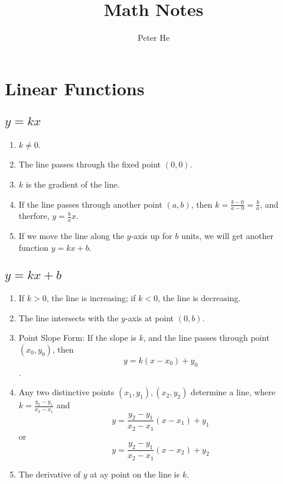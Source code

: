 \documentclass[11pt, oneside]{article}   	%
\title{Math Notes}
\author{Peter He}
\begin{document}
\maketitle




\section{Linear Functions}
\subsection{$y=kx$}
\begin{enumerate}

\item $k\ne0$.
\item The line passes through the fixed point $(0,0)$.
\item $k$ is the gradient of the line.
\item If the line passes through another point $(a,b)$, then $k=\frac{b-0}{a-0}=\frac{b}{a}$, and therfore, $y=\frac{b}{a} x$.
\item If we move the line along the $y$-axis up for $b$ units, we will get another function $y=kx+b$. 
\end{enumerate}

\begin{center}
\end{center}



\subsection{$y=kx+b$}
\begin{enumerate}


\item If $k>0$, the line is increasing; if $k<0$, the line is decreasing.
\item The line intersects with the $y$-axis at point $(0,b)$.
\item Point Slope Form: If the slope is $k$, and the line passes through point $(x_0,y_0)$, then \[y=k(x-x_0)+y_0\].
\item Any two distinctive points $(x_1,y_1), (x_2,y_2)$ determine a line, where $k=\frac{y_2-y_1}{x_2-x_1}$ and \[y=\frac{y_2-y_1}{x_2-x_1}(x-x_1)+y_1\] or  \[y=\frac{y_2-y_1}{x_2-x_1}(x-x_2)+y_2\]
\item The derivative of $y$ at ay point on the line is $k$.
\end{enumerate}
\end{document}
